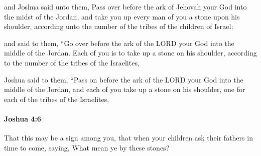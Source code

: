 			\begin{versebox}
					\item[BHS] 
					\item[ASV] and Joshua said unto them, Pass over before the ark of Jehovah your God into the midst of the Jordan, and take you up every man of you a stone upon his shoulder, according unto the number of the tribes of the children of Israel;
					\item[NIV] and said to them, “Go over before the ark of the LORD your God into the middle of the Jordan. Each of you is to take up a stone on his shoulder, according to the number of the tribes of the Israelites,
					\item[NRSV] Joshua said to them, “Pass on before the ark of the LORD your God into the middle of the Jordan, and each of you take up a stone on his shoulder, one for each of the tribes of the Israelites,
			\end{versebox}

		\paragraph{Joshua 4:6} %
			\label{JOSHUA-4-6}

			That this may be a sign among you, that when your children ask their fathers in time to come, saying, What mean ye by these stones?

